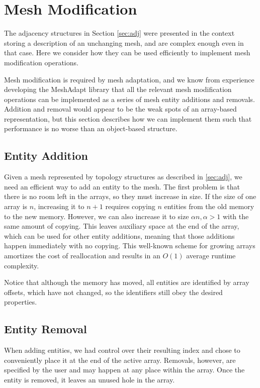 \documentclass{article}
\begin{document}
\section{Mesh Modification}
\label{sec:mod}

The adjacency structures in Section \ref{sec:adj} were presented in
the context storing a description of an unchanging mesh,
and are complex enough even in that case.
Here we consider how they can be used efficiently to implement
mesh modification operations.

Mesh modification is required by mesh adaptation, and we know
from experience developing the MeshAdapt library that all the
relevant mesh modification operations can be implemented as
a series of mesh entity additions and removals.
Addition and removal would appear to be the weak spots of an
array-based representation, but this section describes how
we can implement them such that performance is no worse
than an object-based structure.

\subsection{Entity Addition}

Given a mesh represented by topology structures as described in \ref{sec:adj},
we need an efficient way to add an entity to the mesh.
The first problem is that there is no room left in the arrays,
so they must increase in size.
If the size of one array is $n$, increasing it to $n+1$ requires
copying $n$ entities from the old memory to the new memory.
However, we can also increase it to size $\alpha n, \alpha > 1$
with the same amount of copying.
This leaves auxiliary space at the end of the array, which can
be used for other entity additions, meaning that those
additions happen immediately with no copying.
This well-known scheme for growing arrays amortizes the cost
of reallocation and results in an $O(1)$ average runtime
complexity.

Notice that although the memory has moved, all entities are identified
by array offsets, which have not changed, so the identifiers
still obey the desired properties.

\subsection{Entity Removal}
\label{sec:rem}

When adding entities, we had control over their resulting index
and chose to conveniently place it at the end of the active array.
Removals, however, are specified by the user and may happen at
any place within the array.
Once the entity is removed, it leaves an unused hole in the array.
\end{document}

